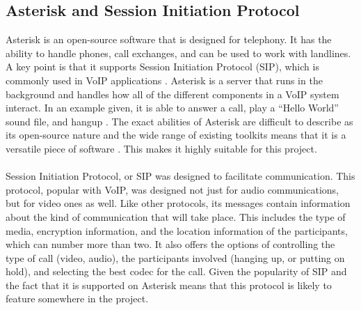 \documentclass[main.tex]{subfiles}
\begin{document}
\subsection{Asterisk and Session Initiation Protocol}
Asterisk is an open-source software that is designed for telephony. It has the ability to handle phones, call exchanges, and can be used to work with landlines. A key point is that it supports Session Initiation Protocol (SIP), which is commonly used in VoIP applications \cite{asterisk-story}. Asterisk is a server that runs in the background and handles how all of the different components in a VoIP system interact. In an example given, it is able to answer a call, play a ``Hello World'' sound file, and hangup \cite{asterisk-more}. The exact abilities of Asterisk are difficult to describe as its open-source nature and the wide range of existing toolkits means that it is a versatile piece of software \cite{asterisk-story}. This makes it highly suitable for this project.
\\\\
Session Initiation Protocol, or SIP was designed to facilitate communication. This protocol, popular with VoIP, was designed not just for audio communications, but for video ones as well. Like other protocols, its messages contain information about the kind of communication that will take place. This includes the type of media, encryption information, and the location information of the participants, which can number more than two. It also offers the options of controlling the type of call (video, audio), the participants involved (hanging up, or putting on hold), and selecting the best codec for the call. Given the popularity of SIP and the fact that it is supported on Asterisk means that this protocol is likely to feature somewhere in the project. \cite{sip}
\end{document}
